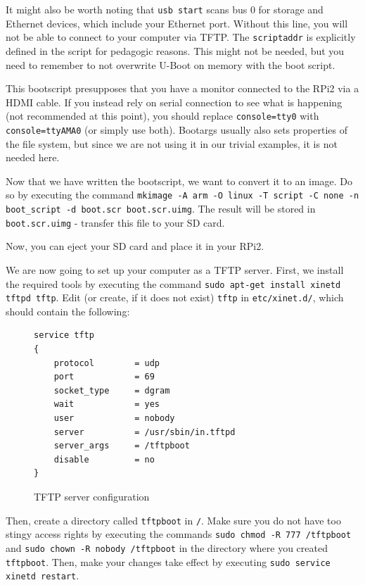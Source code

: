 \documentclass[a4paper,11pt,reqno]{amsart}
\begin{document}
{It might also be worth noting that \texttt{usb start} scans bus 0 for storage and Ethernet devices, which include your Ethernet port. Without this line, you will not be able to connect to your computer via TFTP. The \texttt{scriptaddr} is explicitly defined in the script for pedagogic reasons. This might not be needed, but you need to remember to not overwrite U-Boot on memory with the boot script. 

This bootscript presupposes that you have a monitor connected to the RPi2 via a HDMI cable. If you instead rely on serial connection to see what is happening (not recommended at this point), you should replace \texttt{console=tty0} with \texttt{console=ttyAMA0} (or simply use both). Bootargs usually also sets properties of the file system, but since we are not using it in our trivial examples, it is not needed here.

Now that we have written the bootscript, we want to convert it to an image. Do so by executing the command \texttt{mkimage -A arm -O linux -T script -C none -n boot\_script -d boot.scr boot.scr.uimg}. The result will be stored in \texttt{boot.scr.uimg} - transfer this file to your SD card.

Now, you can eject your SD card and place it in your RPi2.

We are now going to set up your computer as a TFTP server. First, we install the required tools by executing the command \texttt{sudo apt-get install xinetd tftpd tftp}. Edit (or create, if it does not exist) \texttt{tftp} in \texttt{etc/xinet.d/}, which should contain the following:

\begin{figure}[hb]
\begin{center}
\begin{BVerbatim}
service tftp
{
    protocol        = udp
    port            = 69
    socket_type     = dgram
    wait            = yes
    user            = nobody
    server          = /usr/sbin/in.tftpd
    server_args     = /tftpboot
    disable         = no
}
\end{BVerbatim}
\end{center}
\caption{TFTP server configuration}
\label{fig:server}
\end{figure}

Then, create a directory called \texttt{tftpboot} in \texttt{/}. Make sure you do not have too stingy access rights by executing the commands \texttt{sudo chmod -R 777 /tftpboot} and \texttt{sudo chown -R nobody /tftpboot} in the directory where you created \texttt{tftpboot}. Then, make your changes take effect by executing \texttt{sudo service xinetd restart}.

}
\end{document}
